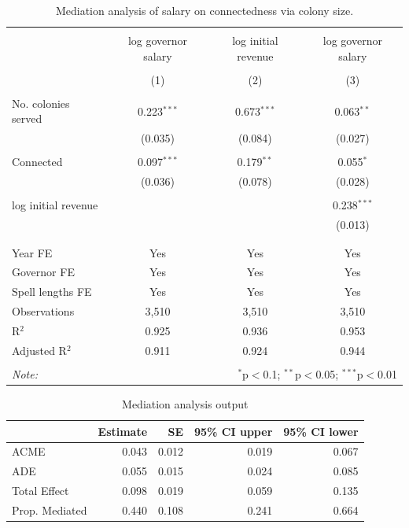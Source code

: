 \documentclass[a4paper]{article}\usepackage[]{graphicx}\usepackage[]{xcolor}
\begin{document}
\begin{table}[!htbp] \centering 
  \caption{Mediation analysis of salary on connectedness via colony size.} 
  \label{tab:mediation1} 
\scriptsize 
\begin{tabular}{@{\extracolsep{5pt}}lccc} 
\\[-1.8ex]\hline 
\hline \\[-1.8ex] 
 & log governor salary & log initial revenue & log governor salary \\ 
\\[-1.8ex] & (1) & (2) & (3)\\ 
\hline \\[-1.8ex] 
 No. colonies served & 0.223$^{***}$ & 0.673$^{***}$ & 0.063$^{**}$ \\ 
  & (0.035) & (0.084) & (0.027) \\ 
  & & & \\ 
 Connected & 0.097$^{***}$ & 0.179$^{**}$ & 0.055$^{*}$ \\ 
  & (0.036) & (0.078) & (0.028) \\ 
  & & & \\ 
 log initial revenue &  &  & 0.238$^{***}$ \\ 
  &  &  & (0.013) \\ 
  & & & \\ 
\hline \\[-1.8ex] 
Year FE & Yes & Yes & Yes \\ 
Governor FE & Yes & Yes & Yes \\ 
Spell lengths FE & Yes & Yes & Yes \\ 
Observations & 3,510 & 3,510 & 3,510 \\ 
R$^{2}$ & 0.925 & 0.936 & 0.953 \\ 
Adjusted R$^{2}$ & 0.911 & 0.924 & 0.944 \\ 
\hline 
\hline \\[-1.8ex] 
\textit{Note:}  & \multicolumn{3}{r}{$^{*}$p$<$0.1; $^{**}$p$<$0.05; $^{***}$p$<$0.01} \\ 
\end{tabular} 
\end{table} 
\begin{table}[!h]
\centering\centering\centering
\caption{\label{tab:mediation2}Mediation analysis output}
\centering
\fontsize{7}{9}\selectfont
\begin{tabular}[t]{lrrrr}
\toprule
  & Estimate & SE & 95\% CI upper & 95\% CI lower\\
\midrule
ACME & 0.043 & 0.012 & 0.019 & 0.067\\
ADE & 0.055 & 0.015 & 0.024 & 0.085\\
Total Effect & 0.098 & 0.019 & 0.059 & 0.135\\
Prop. Mediated & 0.440 & 0.108 & 0.241 & 0.664\\
\bottomrule
\end{tabular}
\end{table}
\end{document}
